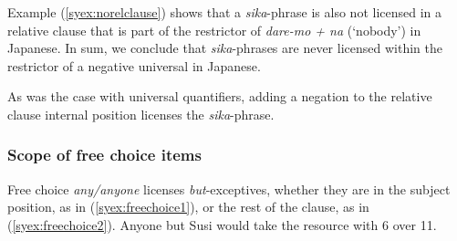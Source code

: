 \documentclass[output=paper]{langscibook}
\begin{document}
\z

Example (\ref{syex:norelclause}) shows that a \emph{sika}-phrase is also not licensed in a relative clause that is part of the restrictor of \emph{dare-mo + na} (`nobody') in Japanese.  In sum, we conclude that \emph{sika}-phrases are never licensed within the restrictor of a negative universal in Japanese.

\z

As was the case with universal quantifiers, adding a negation to the relative clause internal position licenses the \emph{sika}-phrase.

\z


%
        
\subsubsection{Scope of free choice items}
Free choice \emph{any/anyone} licenses \emph{but}-exceptives, whether they are in the subject position, as in (\ref{syex:freechoice1}), or the rest of the clause, as in (\ref{syex:freechoice2}). 
\ea \label{syex:freechoice1}
Anyone but Susi would take the resource with 6 over 11.
\end{document}
